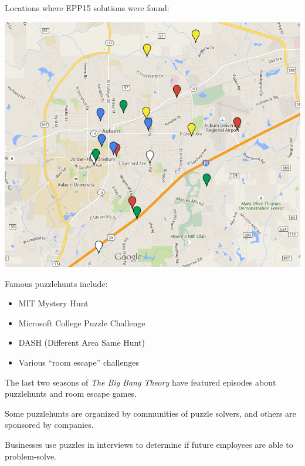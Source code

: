 \documentclass{beamer}
\newcommand{\vpause}{\pause\vspace{1em}}
\begin{document}
\begin{frame}
  Locations where EPP15 solutions were found:

  \begin{center}
    \includegraphics[height=0.7\paperheight]
    {epp15map.png}
  \end{center}
\end{frame}

\begin{frame}
  Famous puzzlehunts include:
  \begin{itemize}\small
  \item MIT Mystery Hunt
  \item Microsoft College Puzzle Challenge
  \item DASH (Different Area Same Hunt)
  \item Various ``room escape'' challenges
  \end{itemize}
  \pause

  The last two seasons of \textit{The Big Bang Theory} have featured
  episodes about puzzlehunts and room escape games.

  \vpause

  Some puzzlehunts are organized by communities of puzzle solvers,
  and others are sponsored by companies.

  \vpause

  Businesses use puzzles in interviews to determine if
  future employees are able to problem-solve.
\end{frame}
\end{document}
